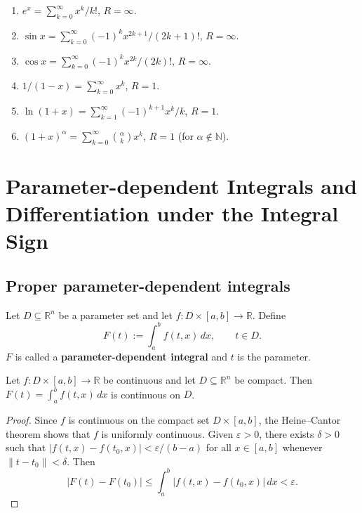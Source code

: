 \begin{example}\label{ex:power_series_examples}
\begin{enumerate}[label=(\roman*)]
    \item $e^x = \sum_{k=0}^{\infty} x^k / k!$, $R = \infty$.
    \item $\sin x = \sum_{k=0}^{\infty} (-1)^k x^{2k+1} / (2k+1)!$, $R = \infty$.
    \item $\cos x = \sum_{k=0}^{\infty} (-1)^k x^{2k} / (2k)!$, $R = \infty$.
    \item $1/(1-x) = \sum_{k=0}^{\infty} x^k$, $R = 1$.
    \item $\ln(1+x) = \sum_{k=1}^{\infty} (-1)^{k+1} x^k / k$, $R = 1$.
    \item $(1+x)^\alpha = \sum_{k=0}^{\infty} \binom{\alpha}{k} x^k$, $R = 1$ (for $\alpha \notin \mathbb{N}$).
\end{enumerate}
\end{example}

\section{Parameter-dependent Integrals and Differentiation under the Integral Sign}

\subsection{Proper parameter-dependent integrals}

\begin{definition}\label{def:parametric_integral}
Let $D \subseteq \mathbb{R}^n$ be a parameter set and let $f: D \times [a, b] \to \mathbb{R}$. Define
\[
F(t) := \int_a^b f(t, x) \, dx, \qquad t \in D.
\]
$F$ is called a \textbf{parameter-dependent integral} and $t$ is the parameter.
\end{definition}

\begin{theorem}\label{thm:parametric_integral_continuity}
Let $f: D \times [a, b] \to \mathbb{R}$ be continuous and let $D \subseteq \mathbb{R}^n$ be compact. Then $F(t) = \int_a^b f(t, x) \, dx$ is continuous on $D$.
\end{theorem}

\begin{proof}
Since $f$ is continuous on the compact set $D \times [a, b]$, the Heine--Cantor theorem shows that $f$ is uniformly continuous. Given $\varepsilon > 0$, there exists $\delta > 0$ such that $|f(t, x) - f(t_0, x)| < \varepsilon / (b - a)$ for all $x \in [a, b]$ whenever $\|t - t_0\| < \delta$. Then
\[
|F(t) - F(t_0)| \le \int_a^b |f(t, x) - f(t_0, x)| \, dx < \varepsilon.
\]
\end{proof}

